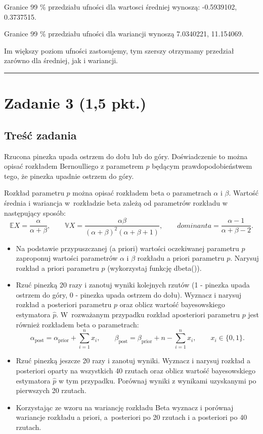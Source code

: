 \documentclass[
]{article}
\begin{document}
Granice 99 \% przedziału ufności dla wartosci średniej wynoszą:
-0.5939102, 0.3737515.

Granice 99 \% przedziału ufności dla wariancji wynoszą 7.0340221,
11.154069.

Im większy poziom ufności zastosujemy, tym szerszy otrzymamy przedział
zarówno dla średniej, jak i wariancji.

\begin{center}\rule{0.5\linewidth}{0.5pt}\end{center}

\hypertarget{zadanie-3-15-pkt.}{%
\section{Zadanie 3 (1,5 pkt.)}\label{zadanie-3-15-pkt.}}

\hypertarget{treux15bux107-zadania-2}{%
\subsection{Treść zadania}\label{treux15bux107-zadania-2}}

Rzucona pinezka upada ostrzem do dołu lub do góry. Doświadczenie to
można opisać rozkładem Bernoulliego z parametrem \(p\) będącym
prawdopodobieństwem tego, że pinezka upadnie ostrzem do góry.

Rozkład parametru \(p\) można opisać rozkładem beta o parametrach
\(\alpha\) i \(\beta\). Wartość średnia i wariancja w~rozkładzie beta
zależą od parametrów rozkładu w następujący sposób:
\[ \mathbb{E}X = \frac{\alpha}{\alpha + \beta}, \qquad \mathbb{V}X = \frac{\alpha\beta}{(\alpha + \beta)^2(\alpha + \beta + 1)}, \qquad dominanta = \frac{\alpha - 1}{\alpha + \beta - 2}.\]

\begin{itemize}
\item
  Na podstawie przypuszczanej (a priori) wartości oczekiwanej parametru
  \(p\) zaproponuj wartości parametrów \(\alpha\) i \(\beta\) rozkładu a
  priori parametru \(p\). Narysuj rozkład a priori parametru \(p\)
  (wykorzystaj funkcję dbeta()).
\item
  Rzuć pinezką 20 razy i zanotuj wyniki kolejnych rzutów (1 - pinezka
  upada ostrzem do góry, 0 - pinezka upada ostrzem do dołu). Wyznacz i
  narysuj rozkład a posteriori parametru \(p\) oraz oblicz wartość
  bayesowskiego estymatora \(\hat{p}\). W~rozważanym przypadku rozkład
  aposteriori parametru \(p\) jest również rozkładem beta o parametrach:
  \[ \alpha_{\textrm{post}} = \alpha_{\textrm{prior}} + \sum_{i=1}^n x_i, \qquad \beta_{\textrm{post}} = \beta_{\textrm{prior}} + n - \sum_{i=1}^n x_i,\qquad x_i\in\{0,1\}.\]
\item
  Rzuć pinezką jeszcze 20 razy i zanotuj wyniki. Wyznacz i narysuj
  rozkład a posteriori oparty na wszystkich 40 rzutach oraz oblicz
  wartość bayesowskiego estymatora \(\hat{p}\) w tym przypadku. Porównaj
  wyniki z wynikami uzyskanymi po pierwszych 20 rzutach.
\item
  Korzystając ze wzoru na wariancję rozkładu Beta wyznacz i porównaj
  wariancje rozkładu a priori, a~posteriori po 20 rzutach i a posteriori
  po 40 rzutach.
\end{itemize}
\end{document}
